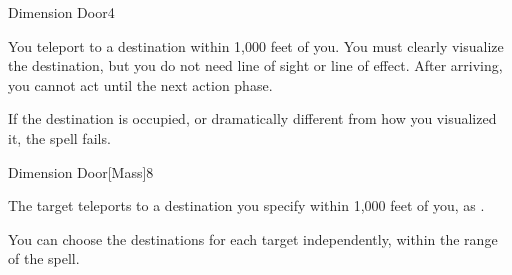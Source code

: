\begin{spellsection}{Dimension Door}{4}
\begin{spellheader}
\end{spellheader}
\begin{spellcontent}
    \begin{spelltargetinginfo}
    \end{spelltargetinginfo}
    \begin{spelleffects}
        \spelleffect You teleport to a destination within 1,000 feet of you. You must clearly visualize the destination, but you do not need line of sight or line of effect. After arriving, you cannot act until the next action phase.

        If the destination is occupied, or dramatically different from how you visualized it, the spell fails.
    \end{spelleffects}
\end{spellcontent}
\begin{spellfooter}
\end{spellfooter}
\end{spellsection}

\begin{spellsection}{Dimension Door}[Mass]{8}
\begin{spellheader}
\end{spellheader}
\begin{spellcontent}
    \begin{spelltargetinginfo}
        \spellrng{\rngmed}
    \end{spelltargetinginfo}
    \begin{spelleffects}
        \spelleffect The target teleports to a destination you specify within 1,000 feet of you, as .
    \end{spelleffects}
\end{spellcontent}
\begin{spellfooter}
    \spellnotes You can choose the destinations for each target independently, within the range of the spell. 
\end{spellfooter}
\end{spellsection}

